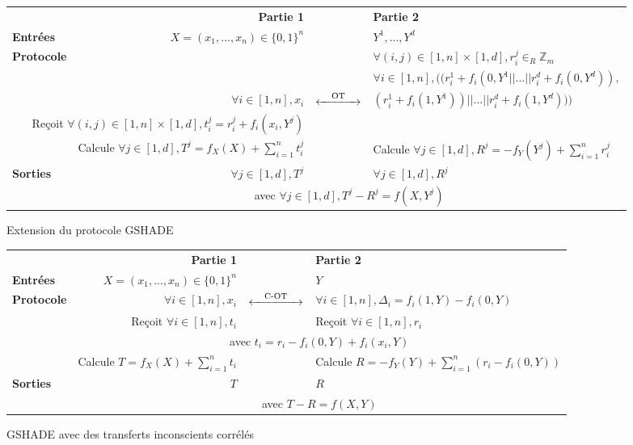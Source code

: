 \documentclass{article}
\begin{document}
\begin{figure}[h]
\centering
\begin{tabular}{|lrcl|}
\hline
 & \textbf{Partie 1} & & \textbf{Partie 2}\\
\textbf{Entrées} & $X =(x_1, ..., x_n) \in \{0, 1\}^n$ & & $Y^1, ..., Y^d$\\
\textbf{Protocole} & & & $\forall (i,j) \in [1, n] \times [1,d], r_i^j \in_R \mathbb{Z}_{m}$ \\
 & & & $\forall i \in [1,n], ((r_i^1 + f_i(0, Y^1 || ... || r_i^d + f_i(0, Y^d)),$ \\
 & $\forall i \in [1, n], x_i$ & $\xleftrightarrow{\hspace{1em} \text{OT}\hspace{1em} }$ &  $(r_i^1+ f_i(1, Y^1)) || ... || r_i^d+ f_i(1, Y^d)))$ \\
\multicolumn{2}{|r}{Reçoit $\forall (i, j) \in [1,n] \times [1,d], t_i^j = r_i^j + f_i(x_i, Y^j)$} & & \\
 & Calcule $\forall j \in [1,d], T^j = f_X(X) + \sum_{i=1}^n t_i^j$ & & Calcule $\forall j \in [1,d], R^j = -f_Y(Y^j) + \sum_{i=1}^n r_i^j$ \\
\textbf{Sorties} & $\forall j \in [1,d], T^j$ & & $\forall j \in [1,d], R^j$ \\
 & \multicolumn{3}{c|}{avec $\forall j \in [1, d], T^j-R^j = f(X, Y^j)$} \\
\hline
\end{tabular}
\captionsetup{labelformat=empty}
\caption{Extension du protocole GSHADE}
\end{figure}

\begin{figure}[h]
\centering
\begin{tabular}{|lrcl|}
\hline
 & \textbf{Partie 1} & & \textbf{Partie 2}\\
\textbf{Entrées} & $X =(x_1, ..., x_n) \in \{0, 1\}^n$ & & $Y$\\
\textbf{Protocole} & $\forall i \in [1, n], x_i$& $\xleftrightarrow{\hspace{1em} \text{C-OT}\hspace{1em} }$ & $\forall i \in [1, n], \Delta_i = f_i(1, Y) - f_i(0, Y)$ \\
 & Reçoit $\forall i \in [1,n], t_i$ & & Reçoit $\forall i \in [1,n], r_i$ \\
 & \multicolumn{3}{c|}{avec $t_i = r_i -f_i(0, Y) + f_i(x_i, Y)$} \\
 & Calcule $T = f_X(X) + \sum_{i=1}^n t_i$ & & Calcule $R = -f_Y(Y) + \sum_{i=1}^n (r_i - f_i(0, Y))$ \\
\textbf{Sorties} & $T$ & & $R$ \\
 & \multicolumn{3}{c|}{avec $T-R = f(X, Y)$} \\
\hline
\end{tabular}
\captionsetup{labelformat=empty}
\caption{GSHADE avec des transferts inconscients corrélés}
\end{figure}
\end{document}
